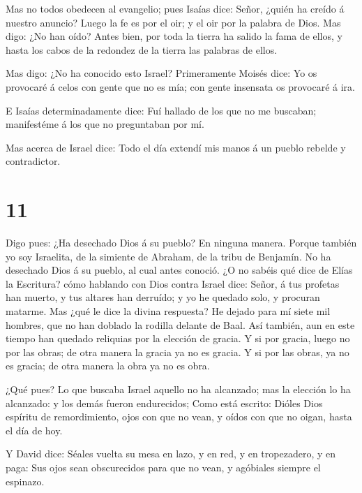  Mas no todos obedecen al evangelio; pues Isaías dice:
Señor, ¿quién ha creído á nuestro anuncio?  Luego la fe es
por el oir; y el oir por la palabra de Dios.  Mas digo: ¿No
han oído? Antes bien, por toda la tierra ha salido la fama de ellos, y
hasta los cabos de la redondez de la tierra las palabras de ellos.

 Mas digo: ¿No ha conocido esto Israel? Primeramente Moisés
dice: Yo os provocaré á celos con gente que no es mía; con gente
insensata os provocaré á ira.

 E Isaías determinadamente dice: Fuí hallado de los que no
me buscaban; manifestéme á los que no preguntaban por mí.

 Mas acerca de Israel dice: Todo el día extendí mis manos á
un pueblo rebelde y contradictor.

\hypertarget{section-10}{%
\section{11}\label{section-10}}

 Digo pues: ¿Ha desechado Dios á su pueblo? En ninguna
manera. Porque también yo soy Israelita, de la simiente de Abraham, de
la tribu de Benjamín.  No ha desechado Dios á su pueblo, al
cual antes conoció. ¿O no sabéis qué dice de Elías la Escritura? cómo
hablando con Dios contra Israel dice:  Señor, á tus profetas
han muerto, y tus altares han derruído; y yo he quedado solo, y procuran
matarme.  Mas ¿qué le dice la divina respuesta? He dejado
para mí siete mil hombres, que no han doblado la rodilla delante de
Baal.  Así también, aun en este tiempo han quedado reliquias
por la elección de gracia.  Y si por gracia, luego no por
las obras; de otra manera la gracia ya no es gracia. Y si por las obras,
ya no es gracia; de otra manera la obra ya no es obra.

 ¿Qué pues? Lo que buscaba Israel aquello no ha alcanzado;
mas la elección lo ha alcanzado: y los demás fueron endurecidos;
 Como está escrito: Dióles Dios espíritu de remordimiento,
ojos con que no vean, y oídos con que no oigan, hasta el día de hoy.

 Y David dice: Séales vuelta su mesa en lazo, y en red, y en
tropezadero, y en paga:  Sus ojos sean obscurecidos para
que no vean, y agóbiales siempre el espinazo.

